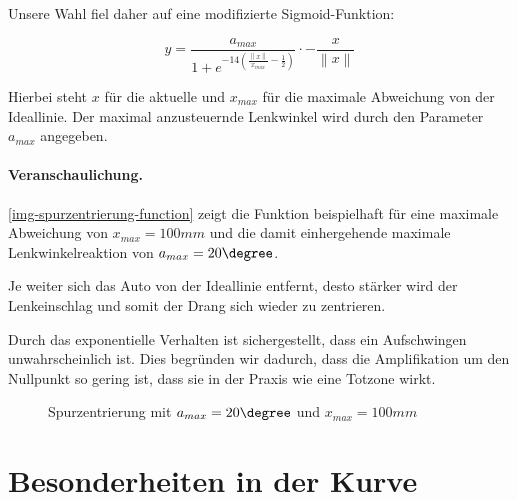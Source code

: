 \documentclass[a4paper,12pt]{report}
\begin{document}
	Unsere Wahl fiel daher auf eine modifizierte Sigmoid-Funktion:

		\[y=\frac{a_{max}}{1 + e^{-14\left( \frac{\left\|x\right\|}{x_{max}} - \frac{1}{2} \right)}} \cdot -\frac{x}{\left\|x\right\|}\]

	Hierbei steht $x$ für die aktuelle und $x_{max}$ für die maximale Abweichung von der Ideallinie.
	Der maximal anzusteuernde Lenkwinkel wird durch den Parameter $a_{max}$ angegeben.

	\paragraph{Veranschaulichung.} \autoref{img-spurzentrierung-function} zeigt die Funktion beispielhaft für eine maximale Abweichung von $x_{max} = 100mm$ und die damit einhergehende maximale Lenkwinkelreaktion von $a_{max} = 20\degree$.

	Je weiter sich das Auto von der Ideallinie entfernt, desto stärker wird der Lenkeinschlag und somit der Drang sich wieder zu zentrieren.

	Durch das exponentielle Verhalten ist sichergestellt, dass ein Aufschwingen unwahrscheinlich ist. Dies begründen wir dadurch, dass die Amplifikation um den Nullpunkt so gering ist, dass sie in der Praxis wie eine Totzone wirkt.

	\begin{figure}[ht]
		\centering


		\caption{Spurzentrierung mit $a_{max} = 20\degree$ und $x_{max} = 100mm$}
		\label{img-spurzentrierung-function}
	\end{figure}

\section{Besonderheiten in der Kurve}
	
\end{document}
